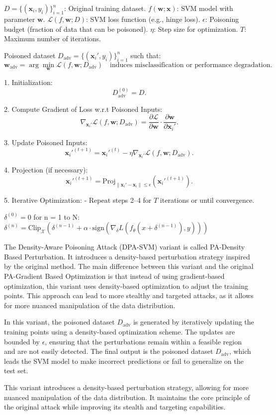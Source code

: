 $D = \{(\mathbf{x}_i, y_i)\}_{i=1}^n$: Original training dataset.
$f(\mathbf{w}; \mathbf{x})$: SVM model with parameter $\mathbf{w}$.
$\mathcal{L}(f, \mathbf{w}; D)$: SVM loss function (e.g., hinge loss).
$\epsilon$: Poisoning budget (fraction of data that can be poisoned).
$\eta$: Step size for optimization.
$T$: Maximum number of iterations.


Poisoned dataset $D_{\text{adv}} = \{(\mathbf{x}_i', y_i)\}_{i=1}^n$ such that:
\[
\mathbf{w}_{\text{adv}} = \arg \min_{\mathbf{w}} \mathcal{L}(f, \mathbf{w}; D_{\text{adv}})
\quad \text{induces misclassification or performance degradation.}
\]

1. Initialization:
   \[
   D_{\text{adv}}^{(0)} = D.
   \]

2. Compute Gradient of Loss w.r.t Poisoned Inputs:
   \[
   \nabla_{\mathbf{x}_i'} \mathcal{L}(f, \mathbf{w}; D_{\text{adv}}) = \frac{\partial \mathcal{L}}{\partial \mathbf{w}} \cdot \frac{\partial \mathbf{w}}{\partial \mathbf{x}_i'}.
   \]

3. Update Poisoned Inputs:
   \[
   \mathbf{x}_i'^{(t+1)} = \mathbf{x}_i'^{(t)} - \eta \nabla_{\mathbf{x}_i'} \mathcal{L}(f, \mathbf{w}; D_{\text{adv}}).
   \]

4. Projection (if necessary):
   \[
   \mathbf{x}_i'^{(t+1)} = \text{Proj}_{\|\mathbf{x}_i' - \mathbf{x}_i\| \leq \epsilon} (\mathbf{x}_i'^{(t+1)}).
   \]

5. Iterative Optimization:
   - Repeat steps 2–4 for $T$ iterations or until convergence.

$\delta^{(0)} = 0$
for n = 1 to N:
$\delta^{(n)} = \text{Clip}_{\mathcal{X}} (\delta^{(n-1)} + \alpha \cdot \text{sign} (\nabla_\delta L(f_\theta(x + \delta^{(n-1)}), y)))$


The Density-Aware Poisoning Attack (DPA-SVM) variant is called PA-Density Based Perturbation. It introduces a density-based perturbation strategy inspired by the original method. The main difference between this variant and the original PA-Gradient Based Optimization is that instead of using gradient-based optimization, this variant uses density-based optimization to adjust the training points. This approach can lead to more stealthy and targeted attacks, as it allows for more nuanced manipulation of the data distribution.

In this variant, the poisoned dataset $D_{\text{adv}}$ is generated by iteratively updating the training points using a density-based optimization scheme. The updates are bounded by $\epsilon$, ensuring that the perturbations remain within a feasible region and are not easily detected. The final output is the poisoned dataset $D_{\text{adv}}$, which leads the SVM model to make incorrect predictions or fail to generalize on the test set.

This variant introduces a density-based perturbation strategy, allowing for more nuanced manipulation of the data distribution. It maintains the core principle of the original attack while improving its stealth and targeting capabilities.